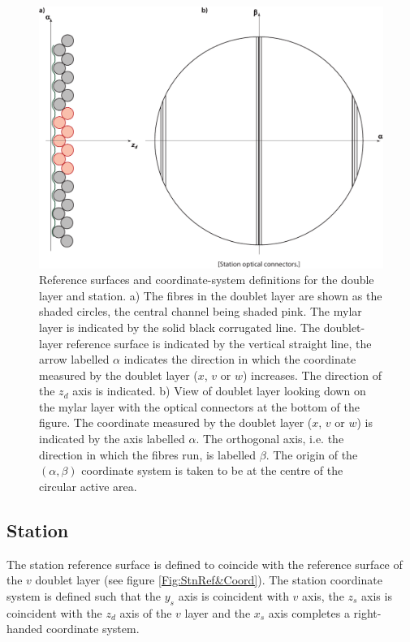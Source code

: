 \begin{figure}
  \begin{center}
    \includegraphics[width=0.7\linewidth] {detectors/tracker/03-Reference-surfaces-and-coordinate-systems/Figures/doublet-layer.pdf}
  \end{center}
  \caption{ Reference surfaces and coordinate-system definitions for the double layer and station. a) The fibres in the doublet layer are shown as the shaded circles, the central channel being shaded pink. The mylar layer is indicated by the solid black corrugated line. The doublet-layer reference surface is indicated by the vertical straight line, the arrow labelled $\alpha$ indicates the direction in which the coordinate measured by the doublet layer ($x$, $v$ or $w$) increases. The direction of the $z_d$ axis is indicated. b) View of doublet layer looking down on the mylar layer with the optical connectors at the bottom of the figure. The coordinate measured by the doublet layer ($x$, $v$ or $w$) is indicated by the axis labelled $\alpha$. The orthogonal axis, i.e. the direction in which the fibres run, is labelled $\beta$. The origin of the $(\alpha, \beta)$ coordinate system is taken to be at the centre of the circular active area.}
  \label{Fig:DblLyrRef&Coord}
\end{figure}

\subsection{Station}
\label{SubSect:RefCoordStn}

The station reference surface is defined to coincide with the reference surface of the $v$ doublet layer (see figure \ref{Fig:StnRef&Coord}). The station coordinate system is defined such that the $y_s$ axis is coincident with $v$ axis, the $z_s$ axis is coincident with the $z_d$ axis of the $v$ layer and the $x_s$ axis completes a right-handed coordinate system.

